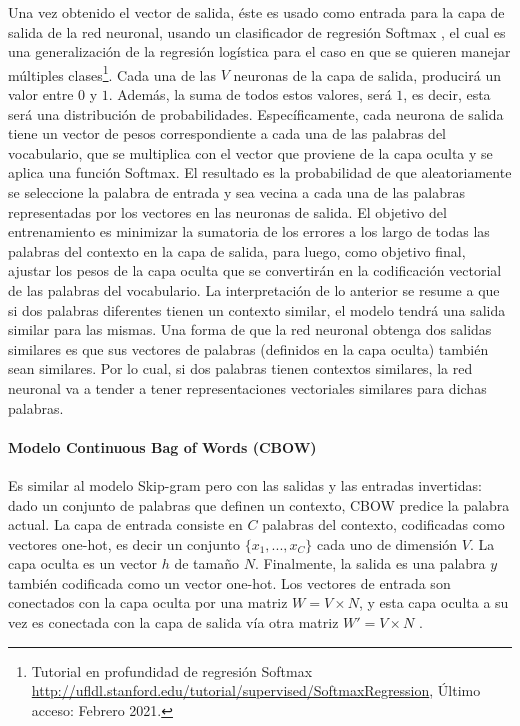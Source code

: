 \bigskip Una vez obtenido el vector de salida, éste es usado como entrada para la capa de salida de la red neuronal, usando un clasificador de regresión Softmax \citep{morin2005hierarchical}, el cual es una generalización de la regresión logística para el caso en que se quieren manejar múltiples clases\footnote{Tutorial en profundidad de regresión Softmax \url{http://ufldl.stanford.edu/tutorial/supervised/SoftmaxRegression}, Último acceso: Febrero 2021.}. Cada una de las \(V\) neuronas de la capa de salida, producirá un valor entre \(0\) y \(1\). Además, la suma de todos estos valores, será \(1\), es decir, esta será una distribución de probabilidades. Específicamente, cada neurona de salida tiene un vector de pesos correspondiente a cada una de las palabras del vocabulario, que se multiplica con el vector que proviene de la capa oculta y se aplica una función Softmax. El resultado es la probabilidad de que aleatoriamente se seleccione la palabra de entrada y sea vecina a cada una de las palabras representadas por los vectores en las neuronas de salida. El objetivo del entrenamiento es minimizar la sumatoria de los errores a los largo de todas las palabras del contexto en la capa de salida, para luego, como objetivo final, ajustar los pesos de la capa oculta que se convertirán en la codificación vectorial de las palabras del vocabulario. La interpretación de lo anterior se resume a que si dos palabras diferentes tienen un contexto similar, el modelo tendrá una salida similar para las mismas. Una forma de que la red neuronal obtenga dos salidas similares es que sus vectores de palabras (definidos en la capa oculta) también sean similares. Por lo cual, si dos palabras tienen contextos similares, la red neuronal va a tender a tener representaciones vectoriales similares para dichas palabras.

\paragraph{Modelo Continuous Bag of Words (CBOW)}
Es similar al modelo Skip-gram pero con las salidas y las entradas invertidas: dado un conjunto de palabras que definen un contexto, CBOW predice la palabra actual. La capa de entrada consiste en \(C\) palabras del contexto, codificadas como vectores one-hot, es decir un conjunto \( \{x_1,..., x_C\}\) cada uno de dimensión \(V\). La capa oculta es un vector \(h\) de tamaño \(N\). Finalmente, la salida es una palabra \(y\) también codificada como un vector one-hot. Los vectores de entrada son conectados con la capa oculta por una matriz \(W=V \times N\), y esta capa oculta a su vez es conectada con la capa de salida vía otra matriz \(W'=V \times N\) \citep{cbowmodel}.

